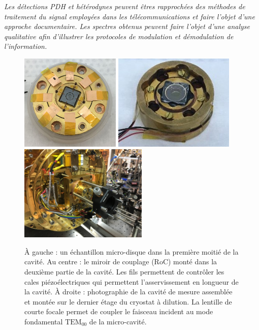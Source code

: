 \documentclass[12pt,a4paper]{article}
\newcommand{\uroc}{\micro RoC}
\begin{document}
\textit{Les détections PDH et hétérodynes peuvent êtres rapprochées des méthodes de traitement du signal employées dans les télécommunications et faire l'objet d'une approche documentaire.
Les spectres obtenus peuvent faire l'objet d'une analyse qualitative afin d'illustrer les protocoles de modulation et démodulation de l'information.}

\begin{figure}
\center
\includegraphics[height=130pt]{figures/cavity_microwheel.jpg}
\includegraphics[height=130pt]{figures/cavity_uroc.jpg}
\includegraphics[height=130pt]{figures/IMG_1766.JPG}
\caption{À gauche : un échantillon micro-disque dans la première moitié de la cavité.
Au centre : le miroir de couplage (\uroc) monté dans la deuxième partie de la cavité.
Les fils permettent de contrôler les cales piézoélectriques qui permettent l'asservissement en longueur de la cavité.
À droite : photographie de la cavité de mesure assemblée et montée sur le dernier étage du cryostat à dilution.
La lentille de courte focale permet de coupler le faisceau incident au mode fondamental $\mathrm{TEM_{00}}$ de la micro-cavité.}
\label{fig:cavity}
\end{figure}
\end{document}
